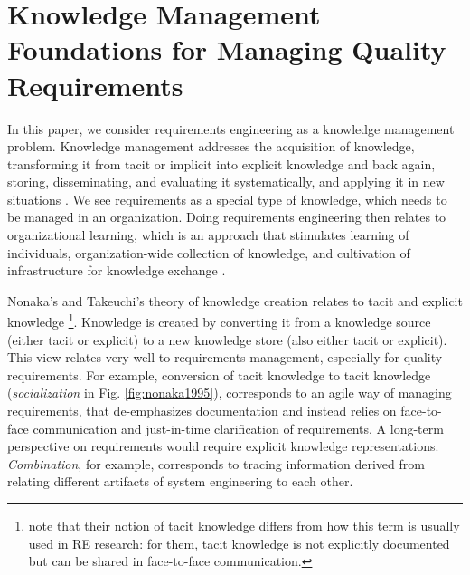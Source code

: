 \section{Knowledge Management Foundations for Managing Quality Requirements}

In this paper, we consider requirements engineering as a knowledge management problem. 
Knowledge management addresses the acquisition of knowledge, transforming it from tacit or implicit into explicit knowledge and back again, storing, disseminating, and evaluating it systematically, and applying it in new situations \cite{Schneider2009}.
We see requirements as a special type of knowledge, which needs to be managed in an organization.
Doing requirements engineering then relates to organizational learning, which is an approach that stimulates learning of individuals, organization-wide collection of knowledge, and cultivation of infrastructure for knowledge exchange \cite{Schneider2009}.




Nonaka's and Takeuchi's theory of knowledge creation relates to tacit and explicit knowledge \cite{Nonaka1995}\footnote{note that their notion of tacit knowledge differs from how this term is usually used in RE research: for them, tacit knowledge is not explicitly documented but can be shared in face-to-face communication.}.  
%
Knowledge is created by converting it from a knowledge source (either tacit or explicit) to a new knowledge store (also either tacit or explicit). 
This view relates very well to requirements management, especially for quality requirements. 
For example, conversion of tacit knowledge to tacit knowledge (\emph{socialization} in Fig. \ref{fig:nonaka1995}), corresponds to an agile way of managing requirements, that de-emphasizes documentation and instead relies on face-to-face communication and just-in-time clarification of requirements. 
A long-term perspective on requirements would require explicit knowledge representations.
\emph{Combination}, for example, corresponds to tracing information derived from relating different artifacts of system engineering to each other. 

